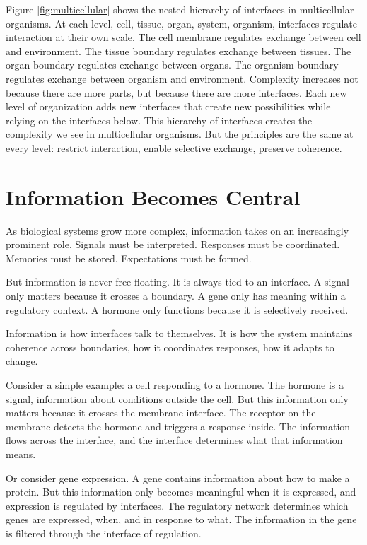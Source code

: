 \documentclass[
  openright]{book}
\begin{document}
Figure \ref{fig:multicellular} shows the nested hierarchy of interfaces
in multicellular organisms. At each level, cell, tissue, organ, system,
organism, interfaces regulate interaction at their own scale. The cell
membrane regulates exchange between cell and environment. The tissue
boundary regulates exchange between tissues. The organ boundary
regulates exchange between organs. The organism boundary regulates
exchange between organism and environment. Complexity increases not
because there are more parts, but because there are more interfaces.
Each new level of organization adds new interfaces that create new
possibilities while relying on the interfaces below. This hierarchy of
interfaces creates the complexity we see in multicellular organisms. But
the principles are the same at every level: restrict interaction, enable
selective exchange, preserve coherence.

\section{Information Becomes Central}\label{information-becomes-central}

As biological systems grow more complex, information takes on an
increasingly prominent role. Signals must be interpreted. Responses must
be coordinated. Memories must be stored. Expectations must be formed.

But information is never free-floating. It is always tied to an
interface. A signal only matters because it crosses a boundary. A gene
only has meaning within a regulatory context. A hormone only functions
because it is selectively received.

Information is how interfaces talk to themselves. It is how the system
maintains coherence across boundaries, how it coordinates responses, how
it adapts to change.

Consider a simple example: a cell responding to a hormone. The hormone
is a signal, information about conditions outside the cell. But this
information only matters because it crosses the membrane interface. The
receptor on the membrane detects the hormone and triggers a response
inside. The information flows across the interface, and the interface
determines what that information means.

Or consider gene expression. A gene contains information about how to
make a protein. But this information only becomes meaningful when it is
expressed, and expression is regulated by interfaces. The regulatory
network determines which genes are expressed, when, and in response to
what. The information in the gene is filtered through the interface of
regulation.
\end{document}

